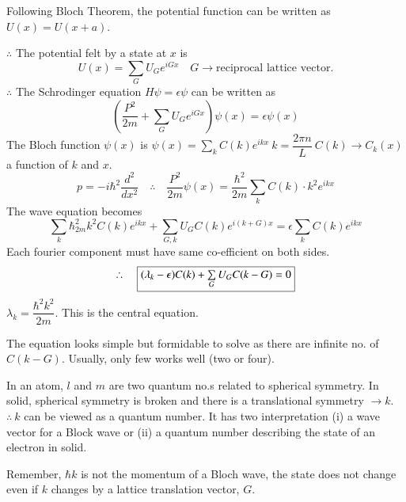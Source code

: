 Following Bloch Theorem, the potential function can be written as $U(x)=U(x+a)$.

$\therefore$ The potential felt by a state at $x$ is
$$
U(x)=\sum\limits_{G}U_{G}e^{iGx}\quad G\to \text{reciprocal lattice vector.}
$$
$\therefore$ The Schrodinger equation $H\psi=\epsilon\psi$ can be written as
$$
\left(\dfrac{P^{2}}{2m}+\sum\limits_{G}U_{G}e^{iGx}\right)\psi(x)=\epsilon\psi(x)
$$
The Bloch function $\psi(x)$ is $\psi(x)=\sum\limits_{k}C(k)e^{ikx} \ k=\dfrac{2\pi n}{L} \ C(k)\to C_{k}(x)$ a function of $k$ and $x$.
$$
p =-i\hbar^{2}\dfrac{d^{2}}{dx^{2}}\quad \therefore\quad \dfrac{P^{2}}{2m}\psi(x) =\dfrac{\hbar^{2}}{2m}\sum\limits_{k}C(k)\cdot k^{2}e^{ikx}
$$
The wave equation becomes
$$
\sum\limits_{k}\hbar^{2}_{2m}k^{2}C(k)e^{ikx}+\sum\limits_{G,k}U_{G}C(k)e^{i(k+G)x}=\epsilon \sum\limits_{k}C(k)e^{ikx}
$$
Each fourier component must have same co-efficient on both sides.
$$
\therefore\quad \fbox{$(\lambda_{k}-\epsilon)C(k)+\sum\limits_{G}U_{G}C(k-G)=0$}
$$
$\lambda_{k}=\dfrac{\hbar^{2}k^{2}}{2m}$. This is the central equation.

The equation looks simple but formidable to solve as there are infinite no. of $C(k-G)$. Usually, only few works well (two or four).

In an atom, $l$ and $m$ are two quantum no.s related to spherical symmetry. In solid, spherical symmetry is broken and there is a translational symmetry $\to k$. $\therefore \ k$ can be viewed as a quantum number. It has two interpretation (i) a wave vector for a Block wave or (ii) a quantum number describing the state of an electron in solid.

Remember, $\hbar k$ is not the momentum of a Bloch wave, the state does not change even if $k$ changes by a lattice translation vector, $G$.

